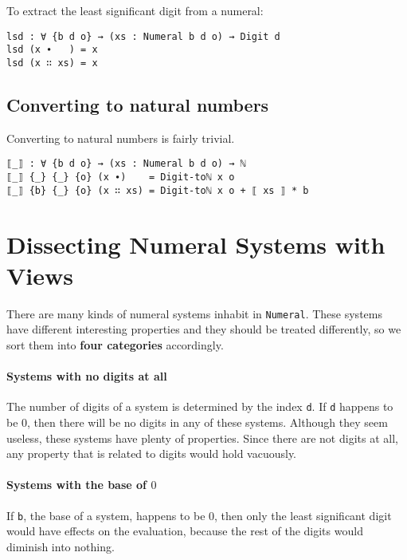 \documentclass[\main/thesis.tex]{subfiles}
\begin{document}
To extract the least significant digit from a numeral:

\begin{lstlisting}
lsd : ∀ {b d o} → (xs : Numeral b d o) → Digit d
lsd (x ∙   ) = x
lsd (x ∷ xs) = x
\end{lstlisting}

\subsection{Converting to natural numbers}

Converting to natural numbers is fairly trivial.

\begin{lstlisting}
⟦_⟧ : ∀ {b d o} → (xs : Numeral b d o) → ℕ
⟦_⟧ {_} {_} {o} (x ∙)    = Digit-toℕ x o
⟦_⟧ {b} {_} {o} (x ∷ xs) = Digit-toℕ x o + ⟦ xs ⟧ * b
\end{lstlisting}


\section{Dissecting Numeral Systems with Views}\label{views}

There are many kinds of numeral systems inhabit in {\lstinline|Numeral|}.
These systems have different interesting properties and they should be treated
differently, so we sort them into \textbf{four categories} accordingly.

\paragraph{Systems with no digits at all}

The number of digits of a system is determined by the index {\lstinline|d|}.
If {\lstinline|d|} happens to be $ 0 $, then there will be no digits in any of
these systems. Although they seem useless, these systems have plenty of properties.
Since there are not digits at all, any property that is related to digits would
hold vacuously.

\paragraph{Systems with the base of $ 0 $}

If {\lstinline|b|}, the base of a system, happens to be $ 0 $,
then only the least significant digit would have effects on the evaluation,
because the rest of the digits would diminish into nothing.
\end{document}
